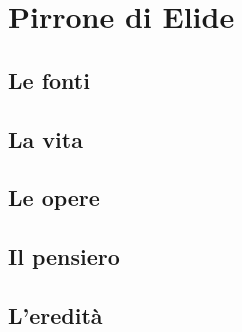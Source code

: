 \chapter{Pirrone di Elide}

\section{Le fonti}

\section{La vita}

\section{Le opere}

\section{Il pensiero}

\section{L'eredità}
